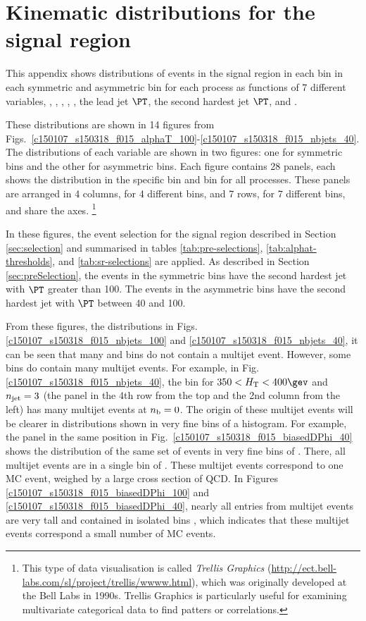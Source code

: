 \section{Kinematic distributions for the signal region}
\label{sec:kisigplot}

This appendix shows distributions of events in the signal region in
each \scalht bin in each symmetric and asymmetric \njet bin for each
process as functions of 7 different variables, \ie, \alphat, \mht,
\bdphi, \met, the lead jet $\PT$, the second hardest jet $\PT$, and
\nb.

These distributions are shown in 14 figures from Figs.~\ref{c150107_s150318_f015_alphaT_100}-\ref{c150107_s150318_f015_nbjets_40}. The distributions of each variable
are shown in two figures: one for symmetric \njet bins and the other for
asymmetric \njet bins. Each figure contains 28 panels, each shows the
distribution in the specific \scalht bin and \njet bin for all
processes. These panels are arranged in 4 columns, for 4 different \njet
bins, and 7 rows, for 7 different \scalht bins, and share the axes.
\footnote{This type of data visualisation is called \textit{Trellis
Graphics} (\url{http://ect.bell-labs.com/sl/project/trellis/wwww.html}),
which was originally developed at the Bell Labs in 1990s. Trellis
Graphics is particularly useful for examining multivariate categorical
data \eg to find patters or correlations.}


In these figures, the event selection for the signal region described
in Section \ref{sec:selection} and summarised in tables
\ref{tab:pre-selections}, \ref{tab:alphat-thresholds}, and
\ref{tab:sr-selections} are applied. As described in Section
\ref{sec:preSelection}, the events in the symmetric \njet bins have
the second hardest jet with $\PT$ greater than 100\gev. The events in
the asymmetric \njet bins have the second hardest jet with $\PT$
between 40 and 100\gev.

From these figures, \eg the \nb distributions in Figs.
\ref{c150107_s150318_f015_nbjets_100} and
\ref{c150107_s150318_f015_nbjets_40}, it can be seen that many \scalht
and \njet bins do not contain a multijet event. However, some bins do
contain many multijet events. For example, in Fig.
\ref{c150107_s150318_f015_nbjets_40}, the bin for $350 < \scalht <
400\gev$ and $n_{\text{jet}} = 3$ (the panel in the 4th row from the top and
the 2nd column from the left) has many multijet events at $n_{\text{b}} = 0$.
The origin of these multijet events will be clearer in distributions
shown in very fine bins of a histogram. For example, the panel in the
same position in Fig.~\ref{c150107_s150318_f015_biasedDPhi_40} shows
the distribution of the same set of events in very fine bins of
\bdphi. There, all multijet events are in a single bin of \bdphi.
These multijet events correspond to one MC event, weighed by a large
cross section of QCD. In Figures
\ref{c150107_s150318_f015_biasedDPhi_100} and
\ref{c150107_s150318_f015_biasedDPhi_40}, nearly all entries from
multijet events are very tall and contained in isolated bins \bdphi,
which indicates that these multijet events correspond a small number
of MC events.

